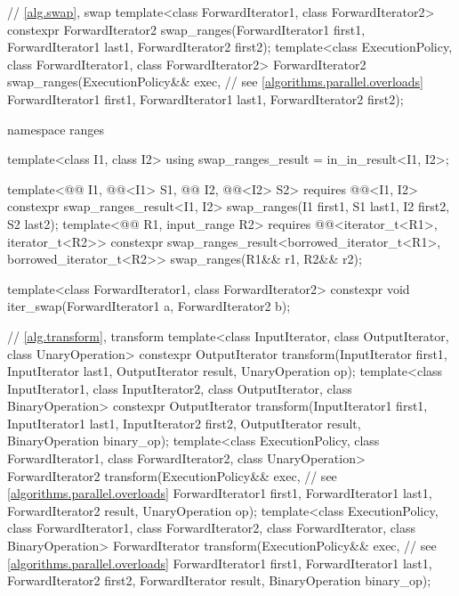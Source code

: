 \begin{codeblock}
{  // \ref{alg.swap}, swap
  template<class ForwardIterator1, class ForwardIterator2>
    constexpr ForwardIterator2 swap_ranges(ForwardIterator1 first1, ForwardIterator1 last1,
                                           ForwardIterator2 first2);
  template<class ExecutionPolicy, class ForwardIterator1, class ForwardIterator2>
    ForwardIterator2 swap_ranges(ExecutionPolicy&& exec,        // see \ref{algorithms.parallel.overloads}
                                 ForwardIterator1 first1, ForwardIterator1 last1,
                                 ForwardIterator2 first2);

  namespace ranges {
    template<class I1, class I2>
      using swap_ranges_result = in_in_result<I1, I2>;

    template<@@ I1, @@<I1> S1, @@ I2, @@<I2> S2>
      requires @@<I1, I2>
      constexpr swap_ranges_result<I1, I2>
        swap_ranges(I1 first1, S1 last1, I2 first2, S2 last2);
    template<@@ R1, input_range R2>
      requires @@<iterator_t<R1>, iterator_t<R2>>
      constexpr swap_ranges_result<borrowed_iterator_t<R1>, borrowed_iterator_t<R2>>
        swap_ranges(R1&& r1, R2&& r2);
  }

  template<class ForwardIterator1, class ForwardIterator2>
    constexpr void iter_swap(ForwardIterator1 a, ForwardIterator2 b);

  // \ref{alg.transform}, transform
  template<class InputIterator, class OutputIterator, class UnaryOperation>
    constexpr OutputIterator
      transform(InputIterator first1, InputIterator last1,
                OutputIterator result, UnaryOperation op);
  template<class InputIterator1, class InputIterator2, class OutputIterator,
           class BinaryOperation>
    constexpr OutputIterator
      transform(InputIterator1 first1, InputIterator1 last1,
                InputIterator2 first2, OutputIterator result,
                BinaryOperation binary_op);
  template<class ExecutionPolicy, class ForwardIterator1, class ForwardIterator2,
           class UnaryOperation>
    ForwardIterator2
      transform(ExecutionPolicy&& exec,                         // see \ref{algorithms.parallel.overloads}
                ForwardIterator1 first1, ForwardIterator1 last1,
                ForwardIterator2 result, UnaryOperation op);
  template<class ExecutionPolicy, class ForwardIterator1, class ForwardIterator2,
           class ForwardIterator, class BinaryOperation>
    ForwardIterator
      transform(ExecutionPolicy&& exec,                         // see \ref{algorithms.parallel.overloads}
                ForwardIterator1 first1, ForwardIterator1 last1,
                ForwardIterator2 first2, ForwardIterator result,
                BinaryOperation binary_op);

}
\end{codeblock}
